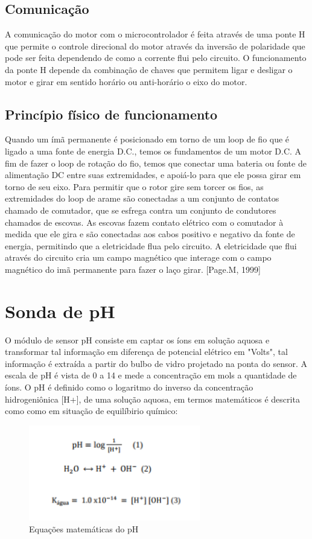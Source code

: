 \subsection{Comunicação}

A comunicação do motor com o microcontrolador é feita através de uma ponte H que permite o controle direcional do motor através da inversão de polaridade que pode ser feita dependendo de como a corrente flui pelo circuito. O funcionamento da ponte H depende da combinação de chaves que permitem ligar e desligar o motor e girar em sentido horário ou anti-horário o eixo do motor.

\subsection{Princípio físico de funcionamento}

Quando um ímã permanente é posicionado em torno de um loop de fio que é ligado a uma fonte de energia D.C., temos os fundamentos de um motor D.C. A fim de fazer o loop de rotação do fio, temos que conectar uma bateria ou fonte de alimentação DC entre suas extremidades, e apoiá-lo para que ele possa girar em torno de seu eixo. Para permitir que o rotor gire sem torcer os fios, as extremidades do loop de arame são conectadas a um conjunto de contatos chamado de comutador, que se esfrega contra um conjunto de condutores chamados de escovas. As escovas fazem contato elétrico com o comutador à medida que ele gira e são conectadas aos cabos positivo e negativo da fonte de energia, permitindo que a eletricidade flua pelo circuito. A eletricidade que flui através do circuito cria um campo magnético que interage com o campo magnético do imã permanente para fazer o laço girar. [Page.M, 1999]

\section{Sonda de pH}

O módulo de sensor pH consiste em captar os íons em solução aquosa e transformar tal informação
em diferença de potencial elétrico em "Volts", tal informação é extraída a partir do bulbo de vidro
projetado na ponta do sensor. A escala de pH é vista de 0 a 14 e mede a concentração em mols a
quantidade de íons. O pH é definido como o logaritmo do inverso da concentração hidrogeniônica
[H+], de uma solução aquosa, em termos matemáticos é descrita como como em situação de
equilíbirio químico:

\begin{figure}[H]
	\centering
	\includegraphics[width=7.5cm]{figuras/calculo_equilibrio.png}
	\caption{Equações matemáticas do pH}
	\label{calculo_equilibrio}
\end{figure}

